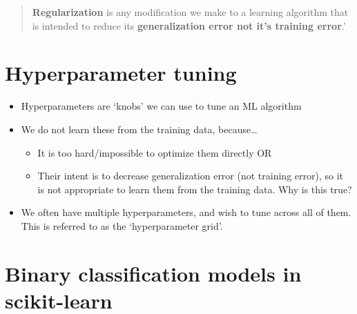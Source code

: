 \documentclass[fontset=fandol,zihao=false,scheme=chinese,heading=true,UTF8]{ctexbook}
\providecommand{\tightlist}{%
  \setlength{\itemsep}{0pt}\setlength{\parskip}{0pt}}
\begin{document}
\begin{quote}
\textbf{Regularization} is any modification we make to a learning algorithm that is intended to reduce its \textbf{generalization error not it's training error}.'
\end{quote}

\hypertarget{hyperparameter-tuning}{%
\section{Hyperparameter tuning}\label{hyperparameter-tuning}}

\begin{itemize}
\tightlist
\item
  Hyperparameters are `knobs' we can use to tune an ML algorithm
\item
  We do not learn these from the training data, because\ldots{}

  \begin{itemize}
  \tightlist
  \item
    It is too hard/impossible to optimize them directly OR
  \item
    Their intent is to decrease generalization error (not training error), so it is not appropriate to learn them from the training data. Why is this true?
  \end{itemize}
\item
  We often have multiple hyperparameters, and wish to tune across all of them. This is referred to as the `hyperparameter grid'.
\end{itemize}

\hypertarget{binary-classification-models-in-scikit-learn}{%
\section{Binary classification models in scikit-learn}\label{binary-classification-models-in-scikit-learn}}
\end{document}
